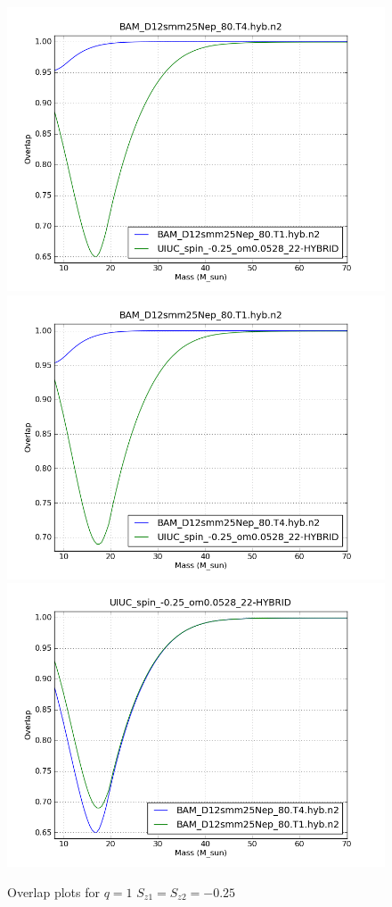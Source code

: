 \begin{figure}
  \includegraphics[width=0.5\linewidth]{figures/ninja2/figure_1_-0d25_02.png} 
  \includegraphics[width=0.5\linewidth]{figures/ninja2/figure_1_-0d25_04.png} \\
  \includegraphics[width=0.5\linewidth]{figures/ninja2/figure_1_-0d25_06.png} 
  \caption[Overlap plots for $q=1$ $S_{z1} = S_{z2} = -0.25$]{
  \label{f:figure_1_-0d25}
Overlap plots for $q=1$ $S_{z1} = S_{z2} = -0.25$}
\end{figure}%



